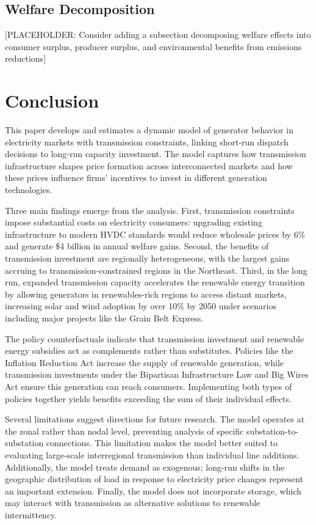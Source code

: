 \documentclass[12pt]{article}
\begin{document}
\subsection{Welfare Decomposition}

[PLACEHOLDER: Consider adding a subsection decomposing welfare effects into consumer surplus, producer surplus, and environmental benefits from emissions reductions]

\section{Conclusion} \label{sec:conclusion}

This paper develops and estimates a dynamic model of generator behavior in electricity markets with transmission constraints, linking short-run dispatch decisions to long-run capacity investment. The model captures how transmission infrastructure shapes price formation across interconnected markets and how these prices influence firms' incentives to invest in different generation technologies.

Three main findings emerge from the analysis. First, transmission constraints impose substantial costs on electricity consumers: upgrading existing infrastructure to modern HVDC standards would reduce wholesale prices by 6\% and generate \$4 billion in annual welfare gains. Second, the benefits of transmission investment are regionally heterogeneous, with the largest gains accruing to transmission-constrained regions in the Northeast. Third, in the long run, expanded transmission capacity accelerates the renewable energy transition by allowing generators in renewables-rich regions to access distant markets, increasing solar and wind adoption by over 10\% by 2050 under scenarios including major projects like the Grain Belt Express.

The policy counterfactuals indicate that transmission investment and renewable energy subsidies act as complements rather than substitutes. Policies like the Inflation Reduction Act increase the supply of renewable generation, while transmission investments under the Bipartisan Infrastructure Law and Big Wires Act ensure this generation can reach consumers. Implementing both types of policies together yields benefits exceeding the sum of their individual effects.

Several limitations suggest directions for future research. The model operates at the zonal rather than nodal level, preventing analysis of specific substation-to-substation connections. This limitation makes the model better suited to evaluating large-scale interregional transmission than individual line additions. Additionally, the model treats demand as exogenous; long-run shifts in the geographic distribution of load in response to electricity price changes represent an important extension. Finally, the model does not incorporate storage, which may interact with transmission as alternative solutions to renewable intermittency.
\end{document}
